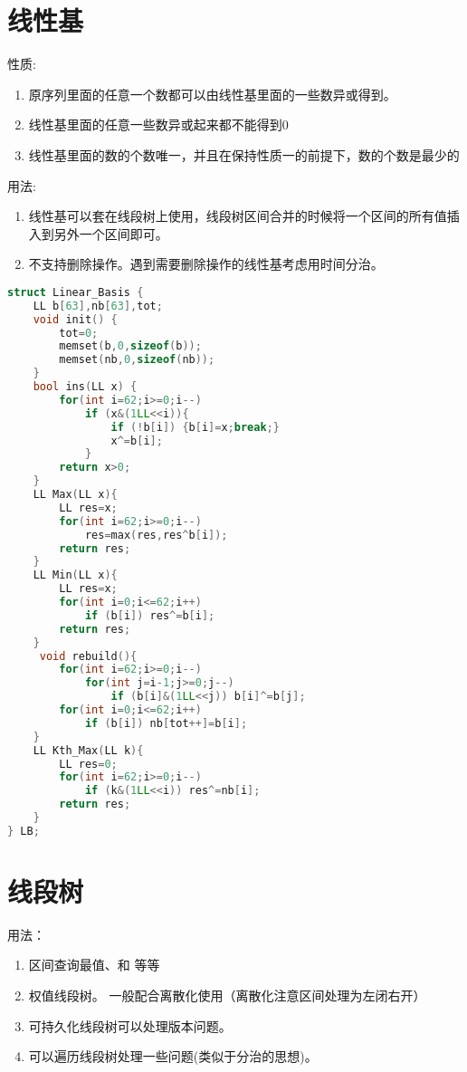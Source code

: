\documentclass[]{article}
\begin{document}
\section{线性基}
性质:
\begin{enumerate}
    \item 原序列里面的任意一个数都可以由线性基里面的一些数异或得到。
    \item 线性基里面的任意一些数异或起来都不能得到0 
    \item 线性基里面的数的个数唯一，并且在保持性质一的前提下，数的个数是最少的
\end{enumerate}
用法:

\begin{enumerate}
    \item 线性基可以套在线段树上使用，线段树区间合并的时候将一个区间的所有值插入到另外一个区间即可。
    \item 不支持删除操作。遇到需要删除操作的线性基考虑用时间分治。
\end{enumerate}

\begin{lstlisting}[language={c}]
    struct Linear_Basis {
    LL b[63],nb[63],tot;
    void init() {
        tot=0;
        memset(b,0,sizeof(b));
        memset(nb,0,sizeof(nb));
    }
    bool ins(LL x) {
        for(int i=62;i>=0;i--)
            if (x&(1LL<<i)){
                if (!b[i]) {b[i]=x;break;}
                x^=b[i];
            }
        return x>0;
    }
    LL Max(LL x){
        LL res=x;
        for(int i=62;i>=0;i--)
            res=max(res,res^b[i]);
        return res;
    }
    LL Min(LL x){
        LL res=x;
        for(int i=0;i<=62;i++)
            if (b[i]) res^=b[i];
        return res;
    }
     void rebuild(){
        for(int i=62;i>=0;i--)
            for(int j=i-1;j>=0;j--)
                if (b[i]&(1LL<<j)) b[i]^=b[j];
        for(int i=0;i<=62;i++)
            if (b[i]) nb[tot++]=b[i];
    }
    LL Kth_Max(LL k){
        LL res=0;
        for(int i=62;i>=0;i--)
            if (k&(1LL<<i)) res^=nb[i];
        return res;
    }
} LB;
\end{lstlisting}


\section{线段树}
用法：
\begin{enumerate}
    \item 区间查询最值、和 等等
    \item 权值线段树。 一般配合离散化使用（离散化注意区间处理为左闭右开）
    \item 可持久化线段树可以处理版本问题。
    \item 可以遍历线段树处理一些问题(类似于分治的思想)。
\end{enumerate}
\end{document}
